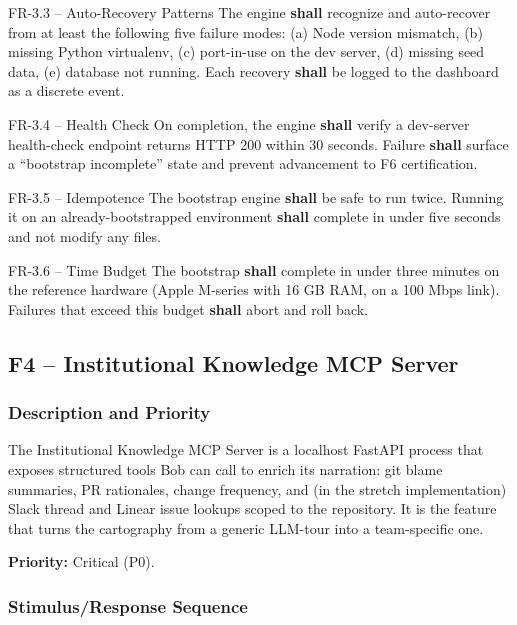 \documentclass[11pt,letterpaper]{article}
\newcommand{\shall}{\textbf{shall}}
\begin{document}
\begin{reqbox}{FR-3.3 -- Auto-Recovery Patterns}
The engine \shall{} recognize and auto-recover from at least the following five failure modes: (a) Node version mismatch, (b) missing Python virtualenv, (c) port-in-use on the dev server, (d) missing seed data, (e) database not running. Each recovery \shall{} be logged to the dashboard as a discrete event.
\end{reqbox}

\begin{reqbox}{FR-3.4 -- Health Check}
On completion, the engine \shall{} verify a dev-server health-check endpoint returns HTTP 200 within 30 seconds. Failure \shall{} surface a ``bootstrap incomplete'' state and prevent advancement to F6 certification.
\end{reqbox}

\begin{reqbox}{FR-3.5 -- Idempotence}
The bootstrap engine \shall{} be safe to run twice. Running it on an already-bootstrapped environment \shall{} complete in under five seconds and not modify any files.
\end{reqbox}

\begin{reqbox}{FR-3.6 -- Time Budget}
The bootstrap \shall{} complete in under three minutes on the reference hardware (Apple M-series with 16 GB RAM, on a 100 Mbps link). Failures that exceed this budget \shall{} abort and roll back.
\end{reqbox}

\subsection{F4 -- Institutional Knowledge MCP Server}

\subsubsection{Description and Priority}

The Institutional Knowledge MCP Server is a localhost FastAPI process that exposes structured tools Bob can call to enrich its narration: git blame summaries, PR rationales, change frequency, and (in the stretch implementation) Slack thread and Linear issue lookups scoped to the repository. It is the feature that turns the cartography from a generic LLM-tour into a team-specific one.

\textbf{Priority:} Critical (P0).

\subsubsection{Stimulus/Response Sequence}
\end{document}
